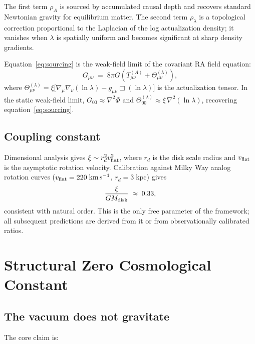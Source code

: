 \documentclass[11pt,twocolumn]{article}
\theoremstyle{plain}
\theoremstyle{remark}
\begin{document}
The first term $\rho_A$ is sourced by accumulated causal depth and
recovers standard Newtonian gravity for equilibrium matter.
The second term $\rho_\lambda$ is a topological correction proportional
to the Laplacian of the log actualization density; it vanishes when
$\lambda$ is spatially uniform and becomes significant at sharp
density gradients.

Equation~\eqref{eq:sourcing} is the weak-field limit of the covariant
RA field equation:
\begin{equation}
  G_{\mu\nu} \;=\; 8\pi G\!\left(T_{\mu\nu}^{(A)}
    + \Theta_{\mu\nu}^{(\lambda)}\right),
  \label{eq:covariant}
\end{equation}
where $\Theta_{\mu\nu}^{(\lambda)} = \xi\bigl[\nabla_\mu\nabla_\nu(\ln\lambda)
- g_{\mu\nu}\Box(\ln\lambda)\bigr]$ is the actualization tensor.
In the static weak-field limit, $G_{00} \approx \nabla^2\Phi$ and
$\Theta_{00}^{(\lambda)} \approx \xi\,\nabla^2(\ln\lambda)$, recovering
equation~\eqref{eq:sourcing}.

\subsection{Coupling constant}
\label{sec:xi}

Dimensional analysis gives $\xi \sim r_d^2 v_{\rm flat}^2$, where
$r_d$ is the disk scale radius and $v_{\rm flat}$ is the asymptotic
rotation velocity.
Calibration against Milky Way analog rotation curves
($v_{\rm flat} = 220\;\mathrm{km\,s^{-1}}$, $r_d = 3\;\mathrm{kpc}$)
gives
\begin{equation}
  \frac{\xi}{G M_{\rm disk}} \;\approx\; 0.33,
  \label{eq:xi}
\end{equation}
consistent with natural order.
This is the only free parameter of the framework;
all subsequent predictions are derived from it or from
observationally calibrated ratios.

\section{Structural Zero Cosmological Constant}
\label{sec:cc}

\subsection{The vacuum does not gravitate}

The core claim is:
\end{document}
